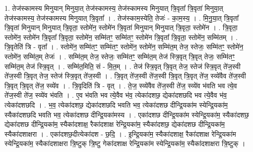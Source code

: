 \documentclass[17pt]{extarticle}
\begin{document}
1. तेज॑स्कामस्य मिनुयान् मिनुया॒त् तेज॑स्कामस्य॒ तेज॑स्कामस्य मिनुयात् त्रि॒वृता᳚ त्रि॒वृता॑ मिनुया॒त् तेज॑स्कामस्य॒ तेज॑स्कामस्य मिनुयात् त्रि॒वृता᳚ । . तेज॑स्काम॒स्येति॒ तेजः॑ - का॒म॒स्य॒ । . मि॒नु॒या॒त् त्रि॒वृता᳚ त्रि॒वृता॑ मिनुयान् मिनुयात् त्रि॒वृता॒ स्तोमे॑न॒ स्तोमे॑न त्रि॒वृता॑ मिनुयान् मिनुयात् त्रि॒वृता॒ स्तोमे॑न । . त्रि॒वृता॒ स्तोमे॑न॒ स्तोमे॑न त्रि॒वृता᳚ त्रि॒वृता॒ स्तोमे॑न॒ सम्मि॑तꣳ॒॒ सम्मि॑तꣳ॒॒ स्तोमे॑न त्रि॒वृता᳚ त्रि॒वृता॒ स्तोमे॑न॒ सम्मि॑तम् । . त्रि॒वृतेति॑ त्रि - वृता᳚ । . स्तोमे॑न॒ सम्मि॑तꣳ॒॒ सम्मि॑तꣳ॒॒ स्तोमे॑न॒ स्तोमे॑न॒ सम्मि॑त॒म् तेज॒ स्तेजः॒ सम्मि॑तꣳ॒॒ स्तोमे॑न॒ स्तोमे॑न॒ सम्मि॑त॒म् तेजः॑ । . सम्मि॑त॒म् तेज॒ स्तेजः॒ सम्मि॑तꣳ॒॒ सम्मि॑त॒म् तेज॑ स्त्रि॒वृत् त्रि॒वृत् तेजः॒ सम्मि॑तꣳ॒॒ सम्मि॑त॒म् तेज॑ स्त्रि॒वृत् । . सम्मि॑त॒मिति॒ सं - मि॒त॒म् । . तेज॑ स्त्रि॒वृत् त्रि॒वृत् तेज॒ स्तेज॑ स्त्रि॒वृत् ते॑ज॒स्वी ते॑ज॒स्वी त्रि॒वृत् तेज॒ स्तेज॑ स्त्रि॒वृत् ते॑ज॒स्वी । . त्रि॒वृत् ते॑ज॒स्वी ते॑ज॒स्वी त्रि॒वृत् त्रि॒वृत् ते॑ज॒ स्व्ये॑वैव ते॑ज॒स्वी त्रि॒वृत् त्रि॒वृत् ते॑ज॒ स्व्ये॑व । . त्रि॒वृदिति॑ त्रि - वृत् । . ते॒ज॒ स्व्ये॑वैव ते॑ज॒स्वी ते॑ज॒ स्व्ये॑व भ॑वति भव त्ये॒व ते॑ज॒स्वी ते॑ज॒ स्व्ये॑व भ॑वति । . ए॒व भ॑वति भव त्ये॒वैव भ॑व॒ त्येका॑दशछ॒ द्येका॑दशछदि भव त्ये॒वैव भ॑व॒ 
त्येका॑दशछदि । . भ॒व॒ त्येका॑दशछ॒ द्येका॑दशछदि भवति भव॒ त्येका॑दशछ दीन्द्रि॒यका॑म स्येन्द्रि॒यका॑म॒ स्यैका॑दशछदि भवति भव॒ त्येका॑दशछ दीन्द्रि॒यका॑मस्य । . एका॑दशछ दीन्द्रि॒यका॑म स्येन्द्रि॒यका॑म॒ स्यैका॑दशछ॒ द्येका॑दशछ दीन्द्रि॒यका॑म॒ स्यैका॑दशाक्ष॒ रैका॑दशाक्ष रेन्द्रि॒यका॑म॒ स्यैका॑दशछ॒ द्येका॑दशछ दीन्द्रि॒यका॑म॒ स्यैका॑दशाक्षरा । . एका॑दशछ॒दीत्येका॑दश - छ॒दि॒ । . इ॒न्द्रि॒यका॑म॒ स्यैका॑दशाक्ष॒ रैका॑दशाक्ष रेन्द्रि॒यका॑म स्येन्द्रि॒यका॑म॒ स्यैका॑दशाक्षरा त्रि॒ष्टुक् त्रि॒ष्टु गेका॑दशाक्ष रेन्द्रि॒यका॑म स्येन्द्रि॒यका॑म॒ स्यैका॑दशाक्षरा त्रि॒ष्टुक् । \newline
\end{document}
